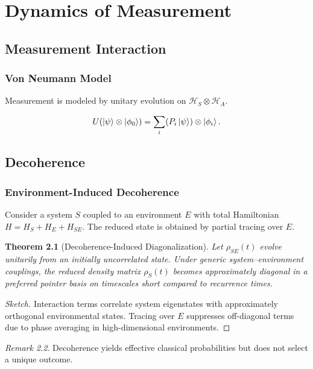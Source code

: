 \documentclass[12pt]{book}
\theoremstyle{plain}
\newtheorem{theorem}{Theorem}[chapter]
\theoremstyle{definition}
\theoremstyle{remark}
\newtheorem{remark}[theorem]{Remark}
\begin{document}
\part{Dynamics of Measurement}

\chapter{Measurement Interaction}

\section{Von Neumann Model}
Measurement is modeled by unitary evolution on $\mathcal{H}_S \otimes \mathcal{H}_A$.

\begin{equation}
U(\ket{\psi}\otimes\ket{\phi_0}) = \sum_i (P_i \ket{\psi}) \otimes \ket{\phi_i}.
\end{equation}

\chapter{Decoherence}

\section{Environment-Induced Decoherence}

Consider a system $S$ coupled to an environment $E$ with total Hamiltonian $H = H_S + H_E + H_{SE}$. The reduced state is obtained by partial tracing over $E$.

\begin{theorem}[Decoherence-Induced Diagonalization]
Let $\rho_{SE}(t)$ evolve unitarily from an initially uncorrelated state. Under generic system--environment couplings, the reduced density matrix $\rho_S(t)$ becomes approximately diagonal in a preferred pointer basis on timescales short compared to recurrence times.
\end{theorem}

\begin{proof}[Sketch]
Interaction terms correlate system eigenstates with approximately orthogonal environmental states. Tracing over $E$ suppresses off-diagonal terms due to phase averaging in high-dimensional environments.
\end{proof}

\begin{remark}
Decoherence yields effective classical probabilities but does not select a unique outcome.
\end{remark}
\end{document}
